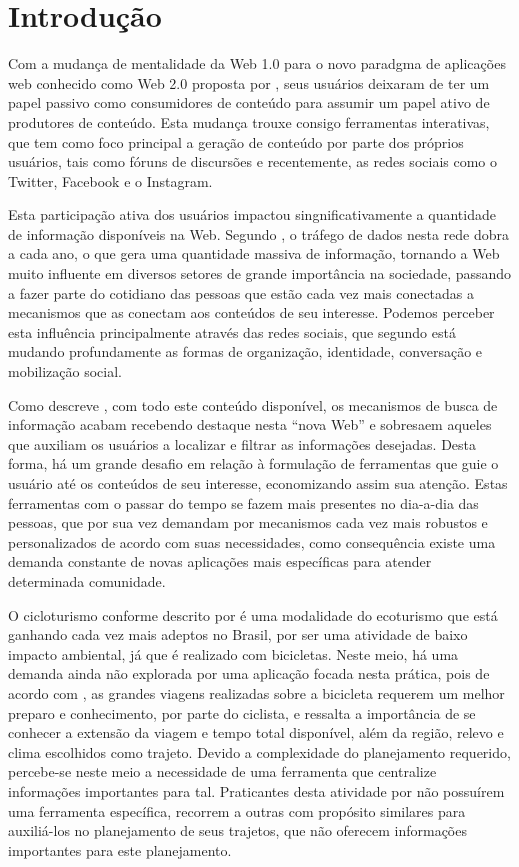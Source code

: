 \section{\esp Introdução}
Com a mudança de mentalidade da Web 1.0 para o novo paradgma de aplicações web conhecido como Web 2.0 proposta por \cite{web20Proposta}, seus 
usuários deixaram de ter um papel passivo como consumidores de conteúdo para assumir um papel ativo de produtores de conteúdo. Esta mudança 
trouxe consigo ferramentas interativas, que tem como foco principal a geração de conteúdo por parte dos próprios usuários, tais como fóruns 
de discursões e recentemente, as redes sociais como o Twitter, Facebook e o Instagram.

Esta participação ativa dos usuários impactou singnificativamente a quantidade de informação disponíveis na Web. Segundo \cite{artigo01}, 
o tráfego de dados nesta rede dobra a cada ano, o que gera uma quantidade massiva de informação, tornando a Web muito influente em diversos setores 
de grande importância na sociedade, passando a fazer parte do cotidiano das pessoas que estão cada vez mais conectadas a mecanismos que as 
conectam aos conteúdos de seu interesse. Podemos perceber esta influência principalmente através das redes sociais, que segundo 
\cite{redesSociais01} está mudando profundamente as formas de organização, identidade, conversação e mobilização social.

Como descreve \cite{deitelAjax}, com todo este conteúdo disponível, os mecanismos de busca de informação 
acabam recebendo destaque nesta ``nova Web'' e sobresaem aqueles que auxiliam os usuários  a localizar e filtrar 
as informações desejadas. Desta forma, há um grande desafio em relação à formulação de ferramentas que guie o usuário até os conteúdos de seu 
interesse, economizando assim sua atenção. Estas ferramentas com o passar do tempo se fazem mais presentes no dia-a-dia das pessoas, 
que por sua vez demandam por mecanismos cada vez mais robustos e personalizados de acordo com suas necessidades, como consequência existe 
uma demanda constante de novas aplicações mais específicas para atender determinada comunidade.

O cicloturismo conforme descrito por \cite{cicloturismo01} é uma modalidade do ecoturismo que está ganhando cada vez mais adeptos no Brasil,
por ser uma atividade de baixo impacto ambiental, já que é realizado com bicicletas. Neste meio, há uma demanda ainda não explorada por 
uma aplicação focada nesta prática, pois de acordo com \cite{cicloturismo02}, as grandes viagens realizadas sobre a bicicleta requerem um melhor
preparo e conhecimento, por parte do ciclista, e ressalta a importância de se conhecer a extensão da viagem e tempo total disponível, além da 
região, relevo e clima escolhidos como trajeto. Devido a complexidade do planejamento requerido, percebe-se neste meio a necessidade de 
uma ferramenta que centralize informações importantes para tal. Praticantes desta atividade por não possuírem uma ferramenta específica, 
recorrem a outras com propósito similares para auxiliá-los no planejamento de seus trajetos, que não oferecem informações importantes para este 
planejamento.

